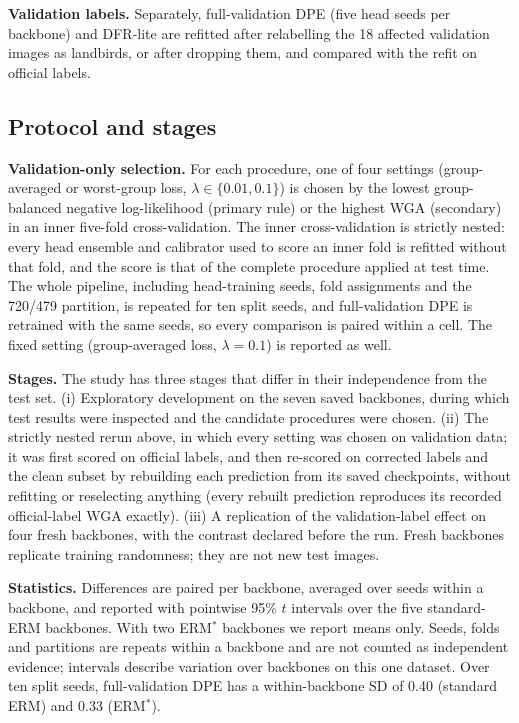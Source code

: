 \textbf{Validation labels.} Separately, full-validation DPE (five head seeds per backbone) and DFR-lite are refitted after relabelling the 18 affected validation images as landbirds, or after dropping them, and compared with the refit on official labels.

\subsection{Protocol and stages}
\textbf{Validation-only selection.} For each procedure, one of four settings (group-averaged or worst-group loss, $\lambda\in\{0.01,0.1\}$) is chosen by the lowest group-balanced negative log-likelihood (primary rule) or the highest WGA (secondary) in an inner five-fold cross-validation. The inner cross-validation is strictly nested: every head ensemble and calibrator used to score an inner fold is refitted without that fold, and the score is that of the complete procedure applied at test time. The whole pipeline, including head-training seeds, fold assignments and the 720/479 partition, is repeated for ten split seeds, and full-validation DPE is retrained with the same seeds, so every comparison is paired within a cell. The fixed setting (group-averaged loss, $\lambda=0.1$) is reported as well.

\textbf{Stages.} The study has three stages that differ in their independence from the test set. (i) Exploratory development on the seven saved backbones, during which test results were inspected and the candidate procedures were chosen. (ii) The strictly nested rerun above, in which every setting was chosen on validation data; it was first scored on official labels, and then re-scored on corrected labels and the clean subset by rebuilding each prediction from its saved checkpoints, without refitting or reselecting anything (every rebuilt prediction reproduces its recorded official-label WGA exactly). (iii) A replication of the validation-label effect on four fresh backbones, with the contrast declared before the run. Fresh backbones replicate training randomness; they are not new test images.

\textbf{Statistics.} Differences are paired per backbone, averaged over seeds within a backbone, and reported with pointwise 95\% $t$ intervals over the five standard-ERM backbones. With two ERM$^*$ backbones we report means only. Seeds, folds and partitions are repeats within a backbone and are not counted as independent evidence; intervals describe variation over backbones on this one dataset. Over ten split seeds, full-validation DPE has a within-backbone SD of 0.40\pp{} (standard ERM) and 0.33\pp{} (ERM$^*$).


